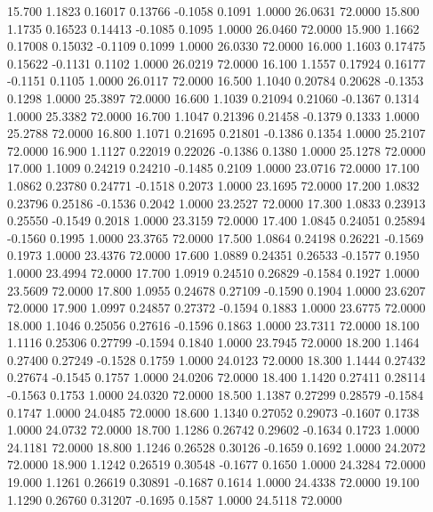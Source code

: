   15.700   1.1823   0.16017   0.13766  -0.1058   0.1091   1.0000  26.0631  72.0000
  15.800   1.1735   0.16523   0.14413  -0.1085   0.1095   1.0000  26.0460  72.0000
  15.900   1.1662   0.17008   0.15032  -0.1109   0.1099   1.0000  26.0330  72.0000
  16.000   1.1603   0.17475   0.15622  -0.1131   0.1102   1.0000  26.0219  72.0000
  16.100   1.1557   0.17924   0.16177  -0.1151   0.1105   1.0000  26.0117  72.0000
  16.500   1.1040   0.20784   0.20628  -0.1353   0.1298   1.0000  25.3897  72.0000
  16.600   1.1039   0.21094   0.21060  -0.1367   0.1314   1.0000  25.3382  72.0000
  16.700   1.1047   0.21396   0.21458  -0.1379   0.1333   1.0000  25.2788  72.0000
  16.800   1.1071   0.21695   0.21801  -0.1386   0.1354   1.0000  25.2107  72.0000
  16.900   1.1127   0.22019   0.22026  -0.1386   0.1380   1.0000  25.1278  72.0000
  17.000   1.1009   0.24219   0.24210  -0.1485   0.2109   1.0000  23.0716  72.0000
  17.100   1.0862   0.23780   0.24771  -0.1518   0.2073   1.0000  23.1695  72.0000
  17.200   1.0832   0.23796   0.25186  -0.1536   0.2042   1.0000  23.2527  72.0000
  17.300   1.0833   0.23913   0.25550  -0.1549   0.2018   1.0000  23.3159  72.0000
  17.400   1.0845   0.24051   0.25894  -0.1560   0.1995   1.0000  23.3765  72.0000
  17.500   1.0864   0.24198   0.26221  -0.1569   0.1973   1.0000  23.4376  72.0000
  17.600   1.0889   0.24351   0.26533  -0.1577   0.1950   1.0000  23.4994  72.0000
  17.700   1.0919   0.24510   0.26829  -0.1584   0.1927   1.0000  23.5609  72.0000
  17.800   1.0955   0.24678   0.27109  -0.1590   0.1904   1.0000  23.6207  72.0000
  17.900   1.0997   0.24857   0.27372  -0.1594   0.1883   1.0000  23.6775  72.0000
  18.000   1.1046   0.25056   0.27616  -0.1596   0.1863   1.0000  23.7311  72.0000
  18.100   1.1116   0.25306   0.27799  -0.1594   0.1840   1.0000  23.7945  72.0000
  18.200   1.1464   0.27400   0.27249  -0.1528   0.1759   1.0000  24.0123  72.0000
  18.300   1.1444   0.27432   0.27674  -0.1545   0.1757   1.0000  24.0206  72.0000
  18.400   1.1420   0.27411   0.28114  -0.1563   0.1753   1.0000  24.0320  72.0000
  18.500   1.1387   0.27299   0.28579  -0.1584   0.1747   1.0000  24.0485  72.0000
  18.600   1.1340   0.27052   0.29073  -0.1607   0.1738   1.0000  24.0732  72.0000
  18.700   1.1286   0.26742   0.29602  -0.1634   0.1723   1.0000  24.1181  72.0000
  18.800   1.1246   0.26528   0.30126  -0.1659   0.1692   1.0000  24.2072  72.0000
  18.900   1.1242   0.26519   0.30548  -0.1677   0.1650   1.0000  24.3284  72.0000
  19.000   1.1261   0.26619   0.30891  -0.1687   0.1614   1.0000  24.4338  72.0000
  19.100   1.1290   0.26760   0.31207  -0.1695   0.1587   1.0000  24.5118  72.0000
